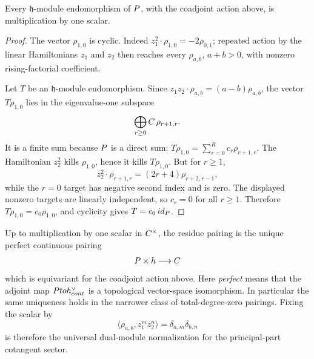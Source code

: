 \begin{lem}
\label{lem:app-matlis-coadjoint-centralizer}
  Every \(\mathfrak h\)-module endomorphism of \(P\), with the
  coadjoint action above, is multiplication by one scalar.
\end{lem}

\begin{proof}
  The vector \(\rho_{1,0}\) is cyclic.  Indeed
  \(z_1^2\cdot\rho_{1,0}=-2\rho_{0,1}\); repeated action by the linear
  Hamiltonians \(z_1\) and \(z_2\) then reaches every
  \(\rho_{a,b}\), \(a+b>0\), with nonzero rising-factorial coefficient.

  Let \(T\) be an \(\mathfrak h\)-module endomorphism.  Since
  \(z_1z_2\cdot\rho_{a,b}=(a-b)\rho_{a,b}\), the vector
  \(T\rho_{1,0}\) lies in the eigenvalue-one subspace
  \[
    \bigoplus_{r\geq0}C\,\rho_{r+1,r}.
  \]
  It is a finite sum because \(P\) is a direct sum:
  \(T\rho_{1,0}=\sum_{r=0}^R c_r\rho_{r+1,r}\).  The Hamiltonian
  \(z_2^2\) kills \(\rho_{1,0}\), hence it kills \(T\rho_{1,0}\).  But
  for \(r\geq1\),
  \[
    z_2^2\cdot\rho_{r+1,r}
      =(2r+4)\rho_{r+2,r-1},
  \]
  while the \(r=0\) target has negative second index and is zero.  The
  displayed nonzero targets are linearly independent, so \(c_r=0\) for
  all \(r\geq1\).  Therefore \(T\rho_{1,0}=c_0\rho_{1,0}\), and cyclicity
  gives \(T=c_0\,id_{P}\).
\end{proof}

\begin{thm}
\label{thm:app-matlis-residue-rigidity}
  Up to multiplication by one scalar in \(C^\times\), the residue
  pairing is the unique perfect continuous pairing
  \[
    P\times h\longrightarrow C
  \]
  which is equivariant for the coadjoint action above.  Here
  \emph{perfect} means that the adjoint map
  \(Ptoh^\vee_{cont}\) is a topological
  vector-space isomorphism.  In particular the same uniqueness holds in
  the narrower class of total-degree-zero pairings.  Fixing the scalar by
  \[
    \langle\rho_{a,b},z_1^m z_2^n\rangle
      =\delta_{a,m}\delta_{b,n}
  \]
  is therefore the universal dual-module normalization for the
  principal-part cotangent sector.
\end{thm}

